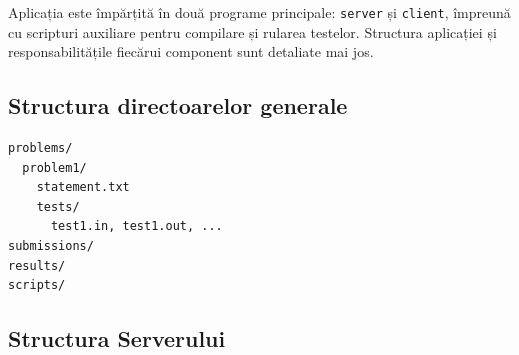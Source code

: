 \documentclass[runningheads]{llncs}
\begin{document}
Aplicația este împărțită în două programe principale: \texttt{server} și \texttt{client}, împreună cu scripturi auxiliare pentru compilare și rularea testelor. Structura aplicației și responsabilitățile fiecărui component sunt detaliate mai jos.

\subsection{Structura directoarelor generale}

\begin{verbatim}
problems/
  problem1/
    statement.txt
    tests/
      test1.in, test1.out, ...
submissions/
results/
scripts/
\end{verbatim}

\subsection{Structura Serverului}
\end{document}
